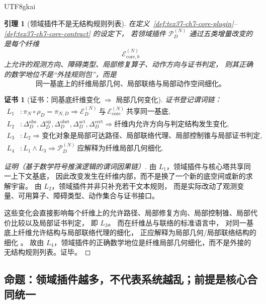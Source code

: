 \documentclass[12pt]{article}
\newtheorem{lemma}{引理}[section]
\newtheorem{Certificate}{证书}[section]
\begin{document}
\begin{CJK*}{UTF8}{gkai}
\begin{lemma}[领域插件不是无结构规则列表]
\label{lem:tex37-ch7-geometry}
在定义~\ref{def:tex37-ch7-core-plugin}--\ref{def:tex37-ch7-core-contract} 的设定下，
若领域插件 $\mathcal P_D^{(N)}$ 通过五类增量改变的是每个纤维
\[
  \mathcal E_{\mathrm{core},b}^{(N)}
\]
上允许的观测方向、障碍类型、局部修复算子、动作方向与证书判定，
则其正确的数学地位不是“外挂规则包”，而是
\[
  \boxed{
    \text{同一基底上的纤维局部几何、局部联络与局部动作空间细化。}
  }
\]
\end{lemma}

\begin{Certificate}[证书：同基底纤维变化 $\Rightarrow$ 局部几何变化]
\label{cert:tex37-ch7-geometry}
证书登记谓词链：
\[
\begin{aligned}
  L_1 &: \pi_N\circ \rho_D=\pi_{N,D}\Rightarrow \mathcal E_D^{(N)}\ \text{与}\ \mathcal E_{\mathrm{core}}^{(N)}\
    \text{共享同一基底},\\
  L_2 &: \Delta_D^{\mathrm{obs}},\Delta_D^{\mathrm{op}},\Delta_D^{\mathrm{obst}},\Delta_D^{\mathrm{act}},
    \Delta_D^{\mathrm{cert}}
  \Rightarrow \text{纤维内允许方向与判定结构发生变化},\\
  L_3 &: L_2\Rightarrow \text{变化对象是局部可达路径、局部联络代理、局部控制锥与局部证书判定},\\
  L_4 &: L_1\wedge L_3\Rightarrow \mathcal P_D^{(N)}\ \text{应解释为纤维局部几何细化}.
\end{aligned}
\]
\end{Certificate}

\begin{proof}[证明（基于数学符号推演逻辑的谓词因果链）]
由 $L_1$，领域插件与核心塔共享同一上下文基底，
因此改变发生在纤维内部，而不是换了一个新的底空间或新的求解宇宙。
由 $L_2$，领域插件并非只补充若干文本规则，
而是实际改动了观测变量、可用算子、障碍类型、动作集合与证书接口。

这些变化会直接影响每个纤维上的允许路径、局部修复方向、局部控制锥、局部代价比较以及局部证书判定，
即 $L_3$。
而在纤维丛与联络的标准语言中，
对同一基底上纤维允许结构与局部联络代理的细化，
正应解释为局部几何/局部联络结构的细化 \cite{RepoTex36HomotopyTwistBijection,KobayashiNomizu1963Foundations}。
故由 $L_4$，领域插件的正确数学地位是纤维局部几何细化，而不是外接的无结构规则列表。证毕。
\end{proof}

\subsection{命题：领域插件越多，不代表系统越乱；前提是核心合同统一}
\label{subsec:tex37-ch7-proposition}


\end{CJK*}
\end{document}
